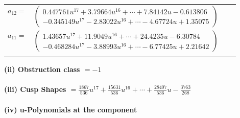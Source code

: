 \documentclass[1p]{elsarticle_modified}
\theoremstyle{definition}
\begin{document}
\begin{tabular}{m{7pt} m{180pt} m{7pt} m{180pt} }
\flushright $a_{12}=$&$\begin{pmatrix}0.447761 u^{17}+3.79664 u^{16}+\cdots+7.84142 u-0.613806\\-0.345149 u^{17}-2.83022 u^{16}+\cdots-4.67724 u+1.35075\end{pmatrix}$ \\
\flushright $a_{11}=$&$\begin{pmatrix}1.43657 u^{17}+11.9049 u^{16}+\cdots+24.4235 u-6.30784\\-0.468284 u^{17}-3.88993 u^{16}+\cdots-6.77425 u+2.21642\end{pmatrix}$\\&\end{tabular}
\flushleft \textbf{(ii) Obstruction class $= -1$}\\~\\
\flushleft \textbf{(iii) Cusp Shapes $= \frac{1867}{536} u^{17}+\frac{15631}{536} u^{16}+\cdots+\frac{28407}{536} u-\frac{3763}{268}$}\\~\\
\newpage\renewcommand{\arraystretch}{1}
\flushleft \textbf{(iv) u-Polynomials at the component}\newline \\
\end{document}
